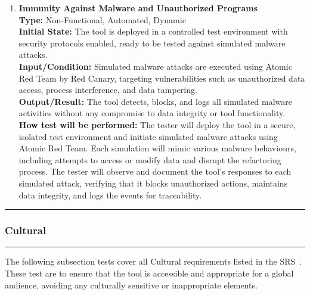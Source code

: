 \documentclass[12pt, titlepage]{article}
\newcommand{\colorrule}{\textcolor{BlueViolet}{\rule{\linewidth}{2pt}}}
\begin{document}
\begin{enumerate}[label={\bf \textcolor{Maroon}{test-SRT-\arabic*}}, wide=0pt, font=\itshape]
  \item \textbf{Immunity Against Malware and Unauthorized Programs} \\[2mm]
    \textbf{Type:} Non-Functional, Automated, Dynamic \\
    \textbf{Initial State:} The tool is deployed in a controlled test environment with security protocols enabled, ready to be tested against simulated malware attacks. \\
    \textbf{Input/Condition:} Simulated malware attacks are executed using Atomic Red Team by Red Canary\cite{ARTCanary}, targeting vulnerabilities such as unauthorized data access, process interference, and data tampering. \\
    \textbf{Output/Result:} The tool detects, blocks, and logs all simulated malware activities without any compromise to data integrity or tool functionality. \\[2mm]
    \textbf{How test will be performed:} The tester will deploy the tool in a secure, isolated test environment and initiate simulated malware attacks using Atomic Red Team. Each simulation will mimic various malware behaviours, including attempts to access or modify data and disrupt the refactoring process. The tester will observe and document the tool's responses to each simulated attack, verifying that it blocks unauthorized actions, maintains data integrity, and logs the events for traceability.
\end{enumerate}

\newpage

\noindent
\colorrule

\subsubsection{Cultural}
\colorrule

\medskip

\noindent
The following subsection tests cover all Cultural requirements listed in the SRS~\cite{SRS}. These test are to ensure that the tool is accessible and appropriate for a global audience, avoiding any culturally sensitive or inappropriate elements. 
\end{document}
